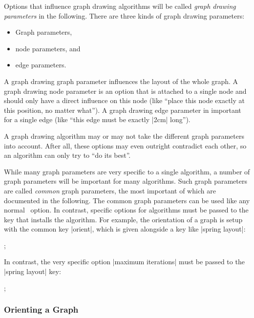 Options that influence graph drawing algorithms will be called
\emph{graph drawing parameters} in the following. There are three kinds of
graph drawing parameters:
\begin{itemize}
\item Graph parameters,
\item node parameters, and
\item edge parameters.
\end{itemize}
A graph drawing graph parameter influences the layout of the whole
graph. A graph drawing node parameter is an option that is attached to
a single node and should only have a direct influence on this node
(like ``place this node exactly at this position, no matter what''). A
graph drawing edge parameter in important for a single edge (like
``this edge must be exactly |2cm| long'').

A graph drawing algorithm may or may not take the different graph
parameters into account. After all, these options may even outright
contradict each other, so an algorithm can only try to ``do its
best''.

While many graph parameters are very specific to a single algorithm, a
number of graph parameters will be important for many algorithms. Such
graph parameters are called \emph{common} graph parameters, the most
important of which are documented in the following. The common graph
parameters can be used like any normal \tikzname\ option. In contrast,
specific options for algorithms must be passed to the key that
installs the algorithm. For example, the orientation of a graph
is setup with the common key |orient|, which is given alongside a key
like |spring layout|:

\begin{codeexample}[]
\tikz {};  
\end{codeexample}

In contrast, the very specific option |maximum iterations| must be
passed to the |spring layout| key:

\begin{codeexample}[]
\tikz {};  
\end{codeexample}



\subsubsection{Orienting a Graph}

